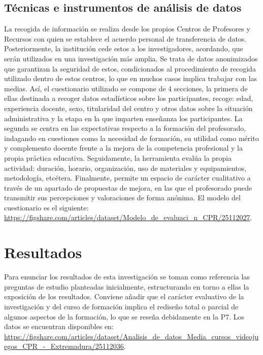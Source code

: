 \documentclass[spanish]{textolivre}
\begin{document}
\subsection{Técnicas e instrumentos de análisis de datos}\label{sec-titulo}
La recogida de información se realiza desde los propios Centros de Profesores y Recursos con quien se establece el acuerdo personal de transferencia de datos. Posteriormente, la institución cede estos a los investigadores, acordando, que serán utilizados en una investigación más amplia. Se trata de datos anonimizados que garantizan la seguridad de estos, condicionados al procedimiento de recogida utilizado dentro de estos centros, lo que en muchos casos implica trabajar con las medias. Así, el cuestionario utilizado se compone de 4 secciones, la primera de ellas destinada a recoger datos estadísticos sobre los participantes, recoge: edad, experiencia docente, sexo, titularidad del centro y otros datos sobre la situación administrativa y la etapa en la que imparten enseñanza los participantes. La segunda se centra en las expectativas respecto a la formación del profesorado, indagando en cuestiones como la necesidad de formación, su utilidad como mérito y complemento docente frente a la mejora de la competencia profesional y la propia práctica educativa. Seguidamente, la herramienta evalúa la propia actividad: duración, horario, organización, uso de materiales y equipamientos, metodología, etcétera. Finalmente, permite un espacio de carácter cualitativo a través de un apartado de propuestas de mejora, en las que el profesorado puede transmitir sus percepciones y valoraciones de forma anónima. El modelo del cuestionario es el siguiente: \url{https://figshare.com/articles/dataset/Modelo_de_evaluaci_n_CPR/25112027}.

\section{Resultados}\label{sec-autores}
Para enunciar los resultados de esta investigación se toman como referencia las preguntas de estudio planteadas inicialmente, estructurando en torno a ellas la exposición de los resultados. Conviene añadir que el carácter evaluativo de la investigación y del curso de formación implica el rediseño total o parcial de algunos aspectos de la formación, lo que se reseña debidamente en la P7. Los datos se encuentran disponibles en: \url{https://figshare.com/articles/dataset/Analisis_de_datos_Media_cursos_videojuegos_CPR_-_Extremadura/25112036}.
\end{document}
